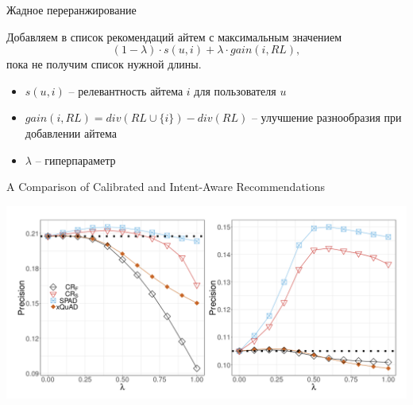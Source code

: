 \documentclass[11pt,aspectratio=169,handout]{beamer}
\begin{document}
\begin{frame}{Жадное переранжирование}

\begin{tcolorbox}[colback=info!5,colframe=info!80,title=]
Добавляем в список рекомендаций айтем с максимальным значением
\[
(1 - \lambda) \cdot s(u, i) + \lambda \cdot gain(i, RL),
\]
пока не получим список нужной длины.
\end{tcolorbox}

\vfill

\begin{itemize}
\item $s(u, i)$ -- релевантность айтема $i$ для пользователя $u$ 
\item $gain(i, RL) = div(RL \cup \{i\}) - div(RL)$ -- улучшение разнообразия при добавлении айтема
\item $\lambda$ -- гиперпараметр
\end{itemize}

\end{frame}

\begin{frame}{A Comparison of Calibrated and Intent-Aware Recommendations \cite{BRIDGE}}
\begin{center}
\includegraphics[scale=0.5]{images/spad.png}
\end{center}
\end{frame}
\end{document}
